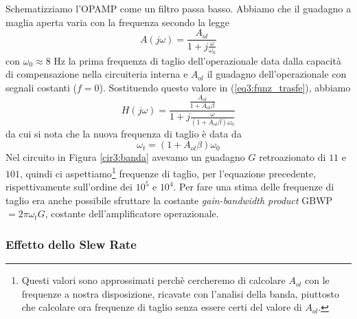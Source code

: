 Schematizziamo l'OPAMP come un filtro passa basso. Abbiamo che il guadagno a maglia aperta varia con la frequenza secondo la legge
\begin{equation}
A(j\omega)=\frac{A_{ol}}{1+j\frac{\omega}{\omega_0}}
\label{eq3:passa_basso}
\end{equation}
con $\omega_0 \approx 8$ \si{\hertz} la prima frequenza di taglio dell'operazionale data dalla capacità di compensazione nella circuiteria interna e $A_{ol}$ il guadagno dell'operazionale con segnali costanti ($f = 0$). Sostituendo questo valore in (\ref{eq3:funz_trasfe}), abbiamo
\begin{equation}
H(j\omega)=\frac{\frac{A_{ol}}{1+A_{ol}\beta}}{1+j \frac{\omega}{(1+A_{ol}\beta)\omega_0}}
\label{eq3:funzione_trasferimento}
\end{equation}
da cui si nota che la nuova frequenza di taglio è data da
\begin{equation}
\omega_t=(1+A_{ol}\beta)\omega_0
\label{eq3:freq_taglio}
\end{equation}
Nel circuito in Figura \ref{cir3:banda} avevamo un guadagno $G$ retroazionato di $11$ e $101$, quindi ci aspettiamo\footnote{Questi valori sono approssimati perchè cercheremo di calcolare $A_{ol}$ con le frequenze a nostra disposizione, ricavate con l'analisi della banda, piuttosto che calcolare ora frequenze di taglio senza essere certi del valore di $A_{ol}$.} frequenze di taglio, per l'equazione precedente, rispettivamente sull'ordine dei $10^5$ e $10^4$. Per fare una stima delle frequenze di taglio era anche possibile sfruttare la costante \textit{gain-bandwidth product} GBWP $= 2 \pi \omega_t G$, costante dell'amplificatore operazionale.

\subsubsection*{Effetto dello Slew Rate}

